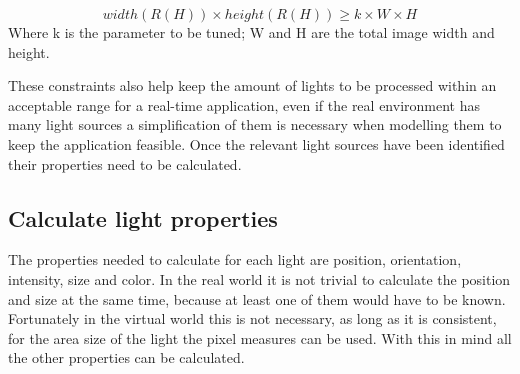 \[
    width(R(H)) \times height(R(H)) \geq k \times W \times H
\]
Where k is the parameter to be tuned; W and H are the total image width and height.\newline

These constraints also help keep the amount of lights to be processed within an acceptable range for a real-time application, even if the real environment has many light sources a simplification of them is necessary when modelling them to keep the application feasible. Once the relevant light sources have been identified their properties need to be calculated.

\subsection{Calculate light properties}
The properties needed to calculate for each light are position, orientation, intensity, size and color. In the real world it is not trivial to calculate the position and size at the same time, because at least one of them would have to be known. Fortunately in the virtual world this is not necessary, as long as it is consistent, for the area size of the light the pixel measures can be used. With this in mind all the other properties can be calculated.

